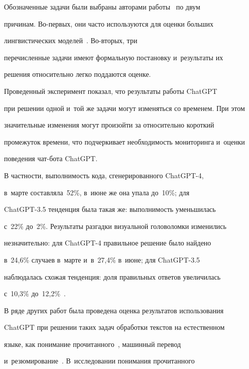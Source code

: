   Обозначенные задачи были выбраны авторами работы~\cite{2-eg} по двум 


причинам. Во-первых, они час\-то используются для оцен\-ки больших 


линг\-ви\-сти\-че\-ских моделей~\cite{3-eg, 4-eg, 5-eg}. Во-вто\-рых, три 


пе\-ре\-чис\-лен\-ные задачи имеют формальную по\-ста\-нов\-ку и~результаты их 


решения относительно лег\-ко поддаются \mbox{оценке}.


  


  Проведенный эксперимент показал, что результаты работы \mbox{ChatGPT} 


при решении одной и~той же задачи могут изменяться со временем. При этом 


значительные изменения могут произойти за относительно короткий 


промежуток времени, что подчеркивает не\-об\-хо\-ди\-мость мониторинга и~оцен\-ки 


поведения чат-бо\-та \mbox{ChatGPT}.




  В частности, выполнимость кода, сгенерированного \mbox{ChatGPT-4}, 


в~мар\-те со\-став\-ля\-ла~52\%, в~июне же она упала до~10\%; для 


 \mbox{ChatGPT-3.5} тенденция была такая же: вы\-пол\-ни\-мость уменьшилась 


с~22\% до~2\%. Результаты разгадки визуальной го\-ло\-во\-лом\-ки изменились 


незначительно: для \mbox{ChatGPT-4} правильное решение было найдено 


в~24,6\% случаев в~мар\-те и~в~27,4\% в~июне; для \mbox{ChatGPT-3.5} 


наблюдалась схожая тенденция: доля правильных ответов увеличилась 


с~10,3\% до~12,2\%~\cite{2-eg}.


  


  В ряде других работ была проведена оцен\-ка результатов использования 


\mbox{ChatGPT} при решении таких задач обработки текс\-тов на естественном 


языке, как понимание прочитанного~\cite{6-eg}, машинный перевод~\cite{7-eg} 


и~резюмирование~\cite{8-eg}. В~исследовании понимания прочитанного  


